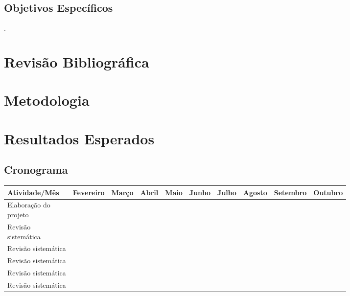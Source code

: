 \documentclass[a4paper, 11pt]{article}
\begin{document}
\vspace{1cm}
\subsection{Objetivos Específicos}

\lipsum[1-2].



\newpage
\section{Revisão Bibliográfica}

\lipsum[1-2]



\newpage
\section{Metodologia}

\lipsum[1-2]



\newpage
\section{Resultados Esperados}

\lipsum[1-2]



\newpage
\begin{landscape}
	\section{Cronograma}
	\centering
		\begin{tabular}{ | p{6em} | p{5em}| p{5em} | p{5em} | p{5em} | p{5em} | p{5em} | p{5em} | p{5em} | p{5em} |} 
			\hline
			Atividade/Mês& Fevereiro & Março & Abril & Maio & Junho & Julho & Agosto & Setembro & Outubro\\ 
			\hline\hline
			\makecell[l]{Elaboração do\\ projeto} &  &  &  &  &  &  &  &  &  \\
			\hline
			\makecell[l]{Revisão \\ sistemática} &  &  &  &  &  &  &  &  &  \\
			\hline
			Revisão sistemática &  &  &  & & & & & & \\
			\hline
			Revisão sistemática &  &  &  & & & & & & \\
			\hline
			Revisão sistemática &  &  &  & & & & & & \\
			\hline
			Revisão sistemática &  &  &  & & & & & & \\
			\hline
		\end{tabular}
\end{landscape}
\end{document}
